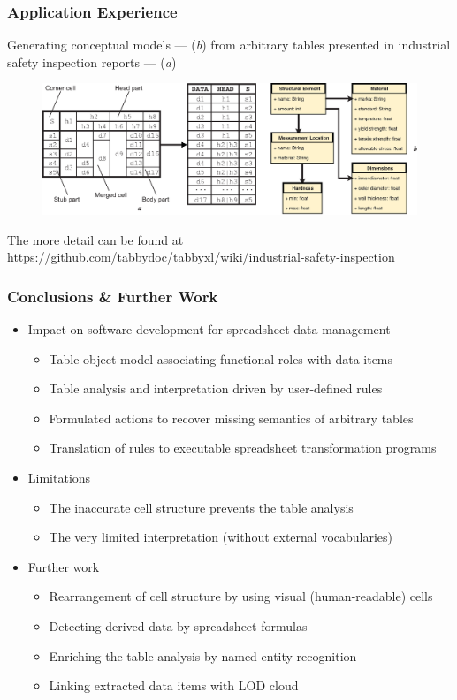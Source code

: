 \documentclass[10pt]{beamer}
\begin{document}
\begin{frame}
\frametitle{Application Experience}
Generating conceptual models --- (\textit{b}) from arbitrary tables presented in industrial safety inspection reports --- (\textit{a})
\begin{figure}
\includegraphics[width=1\linewidth]{application2}
\end{figure}
\tiny{The more detail can be found at \url{https://github.com/tabbydoc/tabbyxl/wiki/industrial-safety-inspection}}
\end{frame}


\begin{frame}
\frametitle{Conclusions \& Further Work}

\begin{itemize}
\item Impact on software development for spreadsheet data management
\begin{itemize}
\item Table object model associating functional roles with data items
\item Table analysis and interpretation driven by user-defined rules
\item Formulated actions to recover missing semantics of arbitrary tables
\item Translation of rules to executable spreadsheet transformation programs
\end{itemize}
\medskip
\item Limitations
\begin{itemize}
\item The inaccurate cell structure prevents the table analysis
\item The very limited interpretation (without external vocabularies)
\end{itemize}
\medskip
\item Further work
\begin{itemize}
\item Rearrangement of cell structure by using visual (human-readable) cells
\item Detecting derived data by spreadsheet formulas
\item Enriching the table analysis by named entity recognition
\item Linking extracted data items with LOD cloud
\end{itemize}
\end{itemize}

\end{frame}
\end{document}

